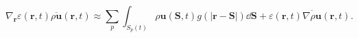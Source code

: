\begin{equation}
\nabla_{\mathbf{r}} \varepsilon (\mathbf{r},t) \overline{\rho \mathbf{u}}(\mathbf{r},t) 
 \approx
\sum_{p}{\int_{S_p(t)}{ \rho \mathbf{u}(\mathbf{S},t) g(|\mathbf{r} - \mathbf{S}|)  \dd
\mathbf{S}}} + \varepsilon (\mathbf{r},t) \overline{\nabla {\rho
\mathbf{u}}}(\mathbf{r},t).
 \label{eq:divepsrhou}
\end{equation}
